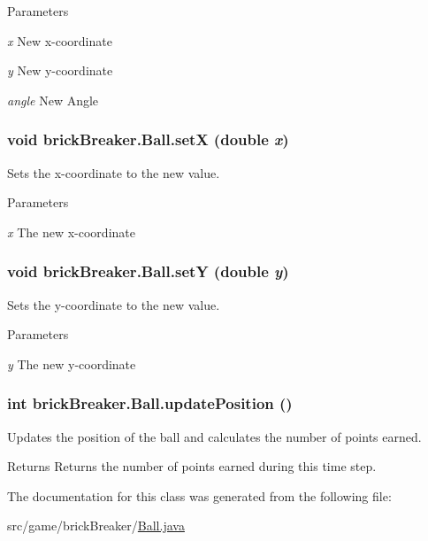 \begin{DoxyParams}{Parameters}
\item[{\em x}]New x-\/coordinate \item[{\em y}]New y-\/coordinate \item[{\em angle}]New Angle \end{DoxyParams}
\hypertarget{classbrick_breaker_1_1_ball_a71e24748f9cb90bd9da6a910648ba84e}{
\subsubsection[{setX}]{\setlength{\rightskip}{0pt plus 5cm}void brickBreaker.Ball.setX (double {\em x})}}
\label{classbrick_breaker_1_1_ball_a71e24748f9cb90bd9da6a910648ba84e}
Sets the x-\/coordinate to the new value. 
\begin{DoxyParams}{Parameters}
\item[{\em x}]The new x-\/coordinate \end{DoxyParams}
\hypertarget{classbrick_breaker_1_1_ball_ae15aedc6cd01476f486328369fd6a799}{
\subsubsection[{setY}]{\setlength{\rightskip}{0pt plus 5cm}void brickBreaker.Ball.setY (double {\em y})}}
\label{classbrick_breaker_1_1_ball_ae15aedc6cd01476f486328369fd6a799}
Sets the y-\/coordinate to the new value. 
\begin{DoxyParams}{Parameters}
\item[{\em y}]The new y-\/coordinate \end{DoxyParams}
\hypertarget{classbrick_breaker_1_1_ball_a7c119360e2434ef5c69020e8608569ff}{
\subsubsection[{updatePosition}]{\setlength{\rightskip}{0pt plus 5cm}int brickBreaker.Ball.updatePosition ()}}
\label{classbrick_breaker_1_1_ball_a7c119360e2434ef5c69020e8608569ff}
Updates the position of the ball and calculates the number of points earned.

\begin{DoxyReturn}{Returns}
Returns the number of points earned during this time step. 
\end{DoxyReturn}


The documentation for this class was generated from the following file:\begin{DoxyCompactItemize}
\item 
src/game/brickBreaker/\hyperlink{_ball_8java}{Ball.java}\end{DoxyCompactItemize}
